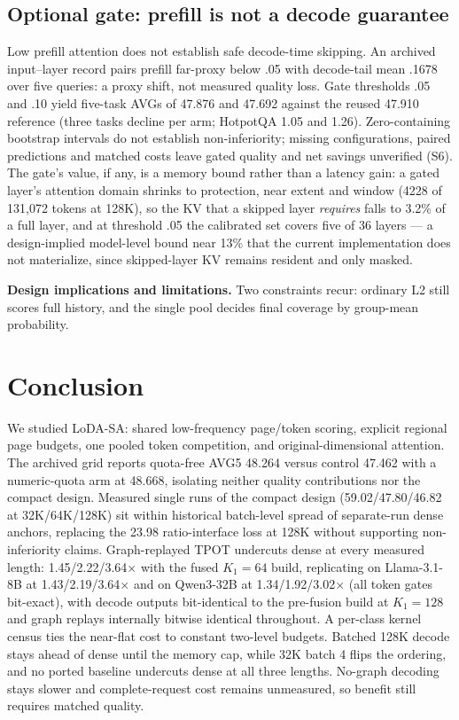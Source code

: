 \documentclass[conference,9pt,letterpaper]{IEEEtran}
\begin{document}
\subsection{Optional gate: prefill is not a decode guarantee}
Low prefill attention does not establish safe decode-time skipping. An archived input--layer record pairs prefill far-proxy below .05 with decode-tail mean .1678 over five queries: a proxy shift, not measured quality loss. Gate thresholds .05 and .10 yield five-task AVGs of 47.876 and 47.692 against the reused 47.910 reference (three tasks decline per arm; HotpotQA 1.05 and 1.26). Zero-containing bootstrap intervals do not establish non-inferiority; missing configurations, paired predictions and matched costs leave gated quality and net savings unverified (S6). The gate's value, if any, is a memory bound rather than a latency gain: a gated layer's attention domain shrinks to protection, near extent and window (4228 of 131,072 tokens at 128K), so the KV that a skipped layer \emph{requires} falls to 3.2\% of a full layer, and at threshold .05 the calibrated set covers five of 36 layers --- a design-implied model-level bound near 13\% that the current implementation does not materialize, since skipped-layer KV remains resident and only masked.

\textbf{Design implications and limitations.} Two constraints recur: ordinary L2 still scores full history, and the single pool decides final coverage by group-mean probability.

\section{Conclusion}
We studied LoDA-SA: shared low-frequency page/token scoring, explicit regional page budgets, one pooled token competition, and original-dimensional attention. The archived grid reports quota-free AVG5 48.264 versus control 47.462 with a numeric-quota arm at 48.668, isolating neither quality contributions nor the compact design. Measured single runs of the compact design (59.02/47.80/46.82 at 32K/64K/128K) sit within historical batch-level spread of separate-run dense anchors, replacing the 23.98 ratio-interface loss at 128K without supporting non-inferiority claims. Graph-replayed TPOT undercuts dense at every measured length: 1.45/2.22/3.64$\times$ with the fused $K_1{=}64$ build, replicating on Llama-3.1-8B at 1.43/2.19/3.64$\times$ and on Qwen3-32B at 1.34/1.92/3.02$\times$ (all token gates bit-exact), with decode outputs bit-identical to the pre-fusion build at $K_1{=}128$ and graph replays internally bitwise identical throughout. A per-class kernel census ties the near-flat cost to constant two-level budgets. Batched 128K decode stays ahead of dense until the memory cap, while 32K batch 4 flips the ordering, and no ported baseline undercuts dense at all three lengths. No-graph decoding stays slower and complete-request cost remains unmeasured, so benefit still requires matched quality.

\smallskip{}\medskip
\clearpage

\end{document}
